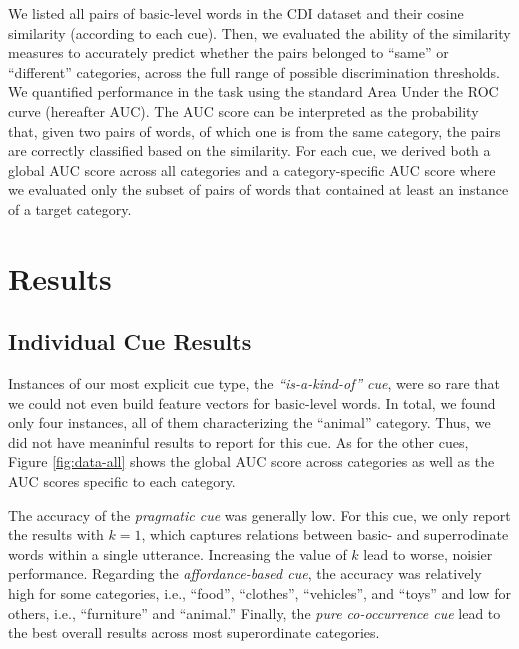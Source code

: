 \documentclass[english,,man,floatsintext]{apa6}
\begin{document}
We listed all pairs of basic-level words in the CDI dataset and their cosine similarity (according to each cue). Then, we evaluated the ability of the similarity measures to accurately
predict whether the pairs belonged to \enquote{same} or \enquote{different}
categories, across the full range of possible discrimination thresholds.
We quantified performance in the task using the standard Area Under the ROC curve (hereafter AUC).
The AUC score can be interpreted as the probability that, given two pairs of words, of which one is from the
same category, the pairs are correctly classified based on the
similarity. For each cue, we derived both a global AUC score across all
categories and a category-specific AUC score where we evaluated only the
subset of pairs of words that contained at least an instance of a target
category.

\hypertarget{results}{%
\section{Results}\label{results}}

\hypertarget{individual-cue-results}{%
\subsection{Individual Cue Results}\label{individual-cue-results}}

Instances of our most explicit cue type, the \emph{\enquote{is-a-kind-of} cue}, were so rare that we could not even build feature vectors for basic-level words. In total, we found only four instances, all of them characterizing the \enquote{animal} category. Thus, we did not have meaninful results to report for this cue. As for the other cues, Figure \ref{fig:data-all} shows the global AUC score across categories as well as the AUC scores specific to each category.

The accuracy of the \emph{pragmatic cue} was generally low. For this cue, we only report the results with \(k=1\), which captures relations between basic- and superrodinate words within a single utterance. Increasing the value of \(k\) lead to worse, noisier performance. Regarding the \emph{affordance-based cue}, the accuracy was relatively high for some categories, i.e., \enquote{food}, \enquote{clothes}, \enquote{vehicles}, and \enquote{toys} and low for others, i.e., \enquote{furniture} and \enquote{animal.} Finally, the \emph{pure co-occurrence cue} lead to the best overall results across most superordinate categories.
\end{document}
